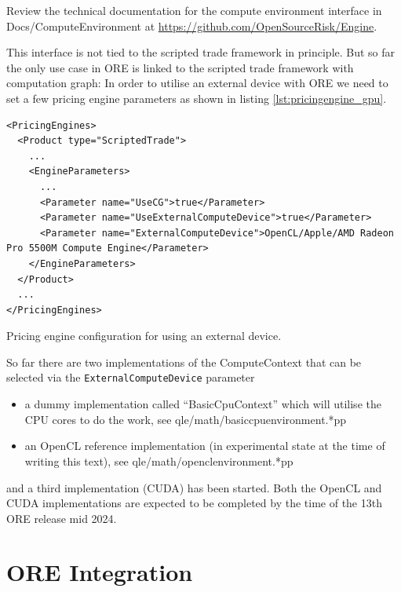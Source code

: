 \documentclass[12pt, a4paper]{report}
\begin{document}
Review the technical documentation for the compute environment interface in Docs/ComputeEnvironment
at \url{https://github.com/OpenSourceRisk/Engine}.

This interface is not tied to the scripted trade framework in principle. But so far the only use
case in ORE is linked to the scripted trade framework with computation graph: In order to utilise an
external device with ORE we need to set a few pricing engine parameters as shown in listing
\ref{lst:pricingengine_gpu}.

\begin{listing}[hbt]
\begin{verbatim}
<PricingEngines>
  <Product type="ScriptedTrade">
    ...
    <EngineParameters>
      ...
      <Parameter name="UseCG">true</Parameter>
      <Parameter name="UseExternalComputeDevice">true</Parameter>
      <Parameter name="ExternalComputeDevice">OpenCL/Apple/AMD Radeon Pro 5500M Compute Engine</Parameter>
    </EngineParameters>
  </Product>
  ...
</PricingEngines>
\end{verbatim}
\caption{Pricing engine configuration for using an external device.}
\label{lst:pricingengine_gpu}
\end{listing}

So far there are two implementations of the ComputeContext that can be selected via the
{\tt ExternalComputeDevice} parameter
\begin{itemize}
\item a dummy implementation called ``BasicCpuContext'' which will utilise the CPU cores to do the work, see qle/math/basiccpuenvironment.*pp
\item an OpenCL reference implementation (in experimental state at the time of writing this text), see qle/math/openclenvironment.*pp
\end{itemize}
and a third implementation (CUDA) has been started. Both the OpenCL and CUDA implementations are
expected to be completed by the time of the 13th ORE release mid 2024.


\chapter{ORE Integration}

\end{document}
